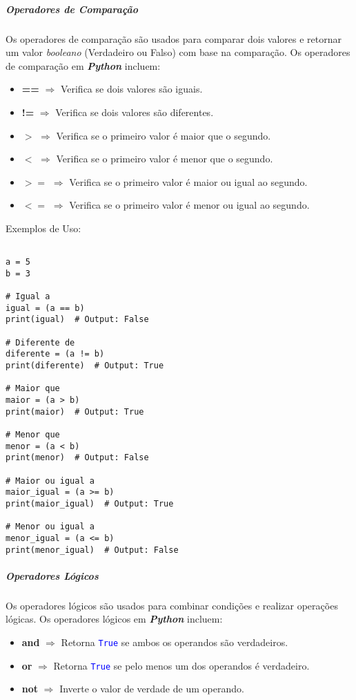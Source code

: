 \documentclass[a4paper, 12pt, onecolumn,singlespacing]{article}
\begin{document}
	\subparagraph{Operadores de Comparação}
	
	Os operadores de comparação são usados para comparar dois valores e retornar um valor \textit{booleano} (Verdadeiro ou Falso) com base na comparação. Os operadores de comparação em \textbf{\textit{Python}} incluem:
	
	\begin{itemize}
		\item \textbf{==} $\Rightarrow$ Verifica se dois valores são iguais.
		\item \textbf{!=} $\Rightarrow$ Verifica se dois valores são diferentes.
		\item \textbf{$>$} $\Rightarrow$ Verifica se o primeiro valor é maior que o segundo.
		\item \textbf{$<$} $\Rightarrow$ Verifica se o primeiro valor é menor que o segundo.
		\item \textbf{$>=$} $\Rightarrow$ Verifica se o primeiro valor é maior ou igual ao segundo.
		\item \textbf{$<=$} $\Rightarrow$ Verifica se o primeiro valor é menor ou igual ao segundo.
	\end{itemize}

Exemplos de Uso:

\begin{verbatim}

a = 5
b = 3

# Igual a
igual = (a == b)
print(igual)  # Output: False

# Diferente de
diferente = (a != b)
print(diferente)  # Output: True

# Maior que
maior = (a > b)
print(maior)  # Output: True

# Menor que
menor = (a < b)
print(menor)  # Output: False

# Maior ou igual a
maior_igual = (a >= b)
print(maior_igual)  # Output: True

# Menor ou igual a
menor_igual = (a <= b)
print(menor_igual)  # Output: False

\end{verbatim}
	\subparagraph{Operadores Lógicos}
	Os operadores lógicos são usados para combinar condições e realizar operações lógicas. Os operadores lógicos em \textbf{\textit{Python}} incluem:
	
	\begin{itemize}
		\item \textbf{and} $\Rightarrow$ Retorna \texttt{\textcolor{blue}{True}} se ambos os operandos são verdadeiros.
		\item \textbf{or} $\Rightarrow$ Retorna \texttt{\textcolor{blue}{True}}  se pelo menos um dos operandos é verdadeiro.
		\item \textbf{not} $\Rightarrow$ Inverte o valor de verdade de um operando.
	\end{itemize}
\end{document}
